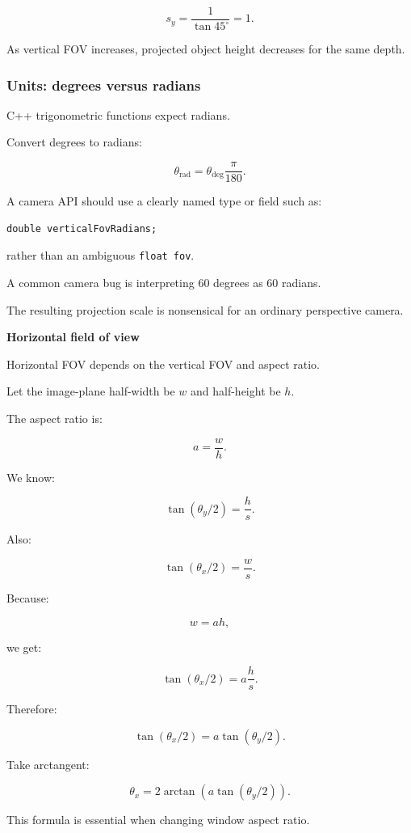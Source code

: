 \[
 s_y=\frac1{\tan45^\circ}=1.
\]

As vertical FOV increases, projected object height decreases for the same depth.

\subsubsection{Units: degrees versus radians}\label{units-degrees-versus-radians}

C++ trigonometric functions expect radians.

Convert degrees to radians:

\[
 \boxed{ \theta_{\mathrm{rad}}= \theta_{\mathrm{deg}}\frac\pi{180} }.
\]

A camera API should use a clearly named type or field such as:

\begin{verbatim}
double verticalFovRadians;
\end{verbatim}

rather than an ambiguous \texttt{float\ fov}.

A common camera bug is interpreting 60 degrees as 60 radians.

The resulting projection scale is nonsensical for an ordinary perspective camera.

\textbf{Horizontal field of view}

Horizontal FOV depends on the vertical FOV and aspect ratio.

Let the image-plane half-width be \(w\) and half-height be \(h\).

The aspect ratio is:

\[
 a=\frac wh.
\]

We know:

\[
 \tan(\theta_y/2)=\frac hs.
\]

Also:

\[
 \tan(\theta_x/2)=\frac ws.
\]

Because:

\[
 w=ah,
\]

we get:

\[
 \tan(\theta_x/2) = a\frac hs.
\]

Therefore:

\[
 \boxed{ \tan(\theta_x/2) = a\tan(\theta_y/2) }.
\]

Take arctangent:

\[
 \boxed{ \theta_x= 2\arctan \left( a\tan(\theta_y/2) \right) }.
\]

This formula is essential when changing window aspect ratio.

